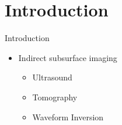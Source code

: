 \section{Introduction}
\begin{frame}{Introduction}
	\begin{itemize}
		\item Indirect subsurface imaging
		\begin{itemize}
			\item Ultrasound
			\item Tomography
			\item Waveform Inversion
		\end{itemize}
	\end{itemize}
\end{frame}